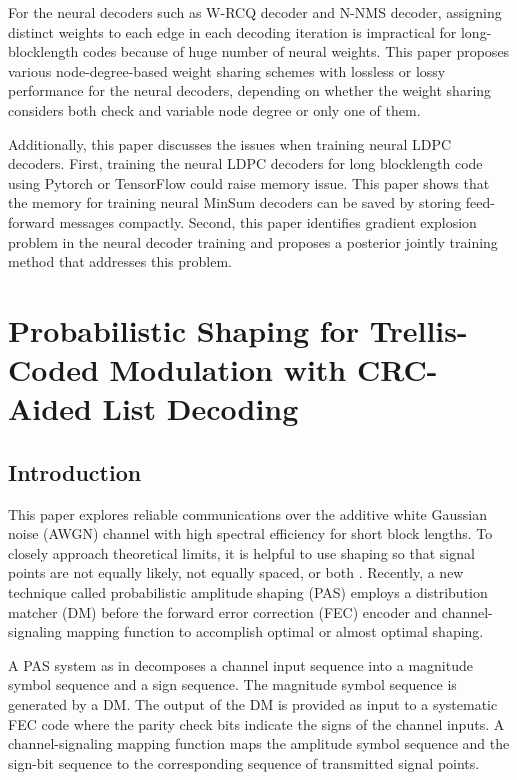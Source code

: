 \documentclass [PhD] {uclathes}
\begin{document}
For the neural decoders such as W-RCQ decoder and N-NMS decoder, assigning distinct weights to each edge in each decoding iteration is impractical for long-blocklength codes because of huge number of neural weights.
This paper proposes various node-degree-based weight sharing schemes with  lossless or lossy performance for the neural decoders, depending on whether the weight sharing considers both check and variable node degree or only one of them. 

Additionally, this paper discusses the issues when training neural LDPC decoders. First, training the neural LDPC decoders for long blocklength code using Pytorch or TensorFlow could raise memory issue. This paper shows that the memory for training neural MinSum decoders can be saved by storing feed-forward messages compactly. Second, this paper identifies gradient explosion problem in the neural decoder training and proposes a  posterior jointly training method that addresses this problem. 


\chapter{Probabilistic Shaping for Trellis-Coded Modulation with CRC-Aided List Decoding}

\section{Introduction}
This paper explores reliable communications over the additive white Gaussian noise (AWGN) channel with high spectral efficiency for short block lengths.  To closely approach theoretical limits, it is helpful to use shaping so that signal points are not equally likely, not equally spaced, or both \cite{gallager1968information,ForneyShaping,forney1992trellis,Kschischangoptimaldist,laroia1994optimal,fragouli2001,xiao2021finite}.  Recently, a new technique called  probabilistic amplitude shaping (PAS) \cite{pas_bocherer_1,pas_bocherer_2} employs a distribution matcher (DM) \cite{CCDM_schulte} before the forward error correction (FEC) encoder and channel-signaling mapping function to accomplish optimal or almost optimal shaping.

A PAS system as in \cite{pas_bocherer_1,pas_bocherer_2} decomposes a channel input sequence into a magnitude symbol sequence and a sign sequence. The magnitude symbol sequence is generated by a DM.  The output of the DM is provided as input to a systematic FEC code where the parity check bits indicate the signs of the channel inputs. A channel-signaling mapping function maps the amplitude symbol sequence and the sign-bit sequence to the corresponding sequence of transmitted signal points.
\end{document}
